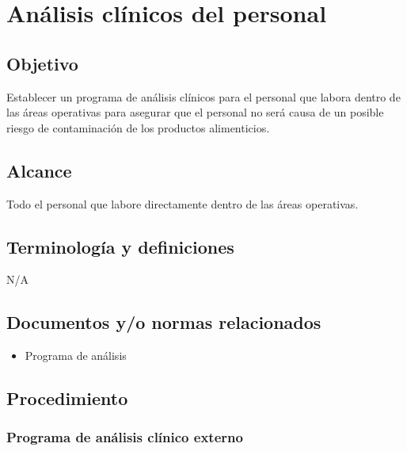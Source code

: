 \renewcommand{\Codigo}{BPD-PROG}
\renewcommand{\FechaPub}{2023-01}
\renewcommand{\Edit}{03}
\renewcommand{\Titulo}{Análisis clínicos del personal}
\section{\Titulo}

\subsection{Objetivo}

Establecer un programa de análisis clínicos para el personal que labora dentro de las áreas operativas para asegurar que el personal no será causa de un posible riesgo de contaminación de los productos alimenticios.

\subsection{Alcance}

Todo el personal que labore directamente dentro de las áreas operativas.

\subsection{Terminología y definiciones}

N/A

\subsection{Documentos y/o normas relacionados}

\begin{itemize}
	\item Programa de análisis
\end{itemize}

\subsection{Procedimiento}

\subsubsection{Programa de análisis clínico externo}

